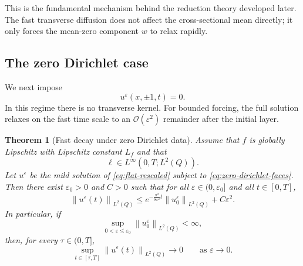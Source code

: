 \documentclass[11pt]{article}
\newtheorem{theorem}{Theorem}[section]
\theoremstyle{definition}
\theoremstyle{remark}
\numberwithin{equation}{section}
\newcommand{\eps}{\varepsilon}
\newcommand{\Q}{Q}
\newcommand{\norm}[1]{\left\lVert#1\right\rVert}
\begin{document}
This is the fundamental mechanism behind the reduction theory developed later. The fast transverse diffusion does not affect the cross-sectional mean directly; it only forces the mean-zero component $w$ to relax rapidly.

\subsection{The zero Dirichlet case}

We next impose
\begin{equation}\label{eq:zero-dirichlet-faces}
u^\eps(x,\pm1,t)=0.
\end{equation}
In this regime there is no transverse kernel.
For bounded forcing, the full solution relaxes on the fast time scale to an $\mathcal O(\eps^2)$ remainder after the initial layer.

\begin{theorem}[Fast decay under zero Dirichlet data]\label{thm:dirichlet-decay}
Assume that $f$ is globally Lipschitz with Lipschitz constant $L_f$ and that
\[
\ell\in L^\infty(0,T;L^2(\Q)).
\]
Let $u^\eps$ be the mild solution of \eqref{eq:flat-rescaled} subject to \eqref{eq:zero-dirichlet-faces}. Then there exist $\eps_0>0$ and $C>0$ such that for all $\eps\in(0,\eps_0]$ and all $t\in[0,T]$,
\begin{equation}\label{eq:dirichlet-est}
\norm{u^\eps(t)}_{L^2(\Q)}
\le e^{-\frac{\pi^2}{8\eps^2}t}\norm{u_0^\eps}_{L^2(\Q)} + C\eps^2.
\end{equation}
In particular, if
\[
\sup_{0<\eps\le \eps_0}\norm{u_0^\eps}_{L^2(\Q)}<\infty,
\]
then, for every $\tau\in(0,T]$,
\begin{equation}\label{eq:dirichlet-conv}
\sup_{t\in[\tau,T]}\norm{u^\eps(t)}_{L^2(\Q)}\longrightarrow 0
\qquad \text{as }\eps\to0.
\end{equation}
\end{theorem}
\end{document}
